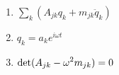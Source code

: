 

\vspace*{\fill}
\centering

\begin{enumerate}
    \item $\displaystyle \sum_{k} (A_{jk}q_{k} + m_{jk}\ddot{q}_{k})$
    \item $\displaystyle q_{k} = a_{k}e^{i \omega t}$
    \item $\displaystyle {\rm det}(A_{jk} - \omega^2m_{jk}) = 0$
\end{enumerate}

\centering
\vspace*{\fill}

